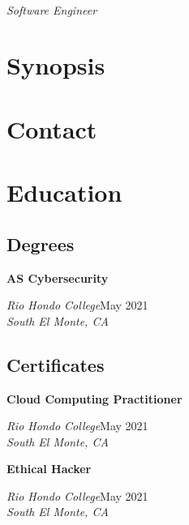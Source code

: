 \documentclass[a4paper]{article}
\begin{document}
\begin{minipage}[t]{0.36\textwidth}
    \raggedright
    \vspace*{0pt}
    {\bfseries\LARGE\textsf\appfirstname{}} {\bfseries\LARGE\textsf\applastname{}} \\
    {\large\textit{Software Engineer}}

    \section{Synopsis}
    \appsynopsis{}

    \section{Contact}
    \vbox{
    }

    \section{Education}
    \subsection{Degrees}
    \textbf{AS Cybersecurity}\par
    \textit{Rio Hondo College}\hfill May 2021 \\
    \textit{South El Monte, CA}

    \subsection{Certificates}
    \textbf{Cloud Computing Practitioner}\par
    \textit{Rio Hondo College}\hfill May 2021 \\
    \textit{South El Monte, CA}

    \textbf{Ethical Hacker}\par
    \textit{Rio Hondo College}\hfill May 2021 \\
    \textit{South El Monte, CA}
\end{minipage}\hfill
\end{document}
